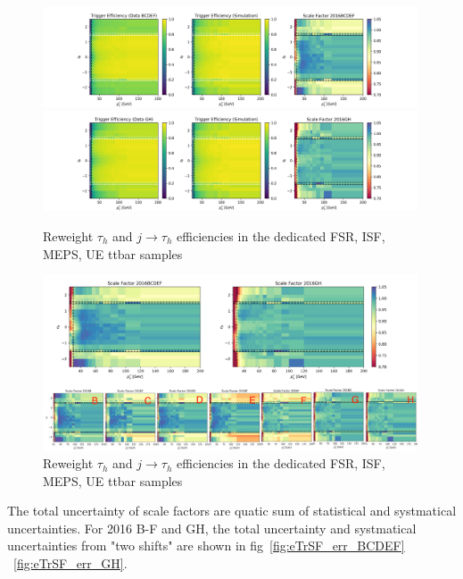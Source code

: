 \begin{figure}
    \centering
    \includegraphics[width=0.99\textwidth]{chapters/Appendix/sectionEleTrigger/figures/eff2d_BCDEF.png}
    \includegraphics[width=0.99\textwidth]{chapters/Appendix/sectionEleTrigger/figures/eff2d_GH.png}
    \caption{Reweight $\tau_h$ and $j \to \tau_h$ efficiencies in the dedicated FSR, ISF, MEPS, UE ttbar samples}
    \label{fig:appendix:ele27SF}
\end{figure}



\begin{figure}
    \centering
    \includegraphics[width=0.99\textwidth]{chapters/Appendix/sectionEleTrigger/figures/eTrSF_value.png}
    \caption{Reweight $\tau_h$ and $j \to \tau_h$ efficiencies in the dedicated FSR, ISF, MEPS, UE ttbar samples}
    \label{fig:appendix:ele27SF}
\end{figure}




The total uncertainty of scale factors are quatic sum of statistical and systmatical uncertainties.
For 2016 B-F and GH, the total uncertainty and systmatical uncertainties from "two shifts" are shown
in fig~\ref{fig:eTrSF_err_BCDEF} ~\ref{fig:eTrSF_err_GH}.

